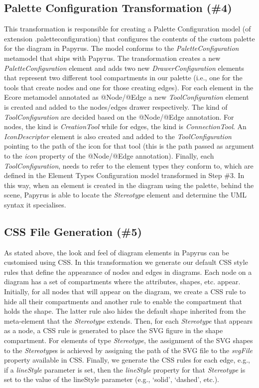 \subsection{Palette Configuration Transformation (\#4)}
\label{sec:paletteGeneration}
This transformation is responsible for creating a Palette Configuration model (of extension .paletteconfiguration) that configures the contents of the custom palette for the diagram in Papyrus. 
The model conforms to the \textit{PaletteConfiguration} metamodel that ships with Papyrus.
The transformation creates a new \textit{PaletteConfiguration} element and adds two new \textit{DrawerConfiguration} elements that represent two different tool compartments in our palette (i.e., one for the tools that create nodes and one for those creating edges). 
For each element in the Ecore metamodel annotated as @Node/@Edge a new \textit{ToolConfiguration} element is created and added to the nodes/edges drawer respectively. 
The kind of \textit{ToolConfiguration} are decided based on the @Node/@Edge annotation. For nodes, the kind is \textit{CreationTool} while for edges, the kind is \textit{ConnectionTool}.
An \textit{IconDescriptor} element is also created and added to the \textit{ToolConfiguration} pointing to the path of the icon for that tool (this is the path passed as argument to the \textit{icon} property of the @Node/@Edge annotation).
Finally, each \textit{ToolConfiguration}, needs to refer to the element types they conform to, which are defined in the Element Types Configuration model transformed in Step \#3. 
In this way, when an element is created in the diagram using the palette, behind the scene, Papyrus is able to locate the \textit{Stereotype} element and determine the UML syntax it specialises.

\subsection{CSS File Generation (\#5)}
\label{sec:cssGeneration}
As stated above, the look and feel of diagram elements in Papyrus can be customised using CSS. 
In this transformation we generate our default CSS style rules that define the appearance of nodes and edges in diagrams. 
Each node on a diagram has a set of compartments where the attributes, shapes, etc. appear. 
Initially, for all nodes that will appear on the diagram, we create a CSS rule to hide all their compartments and another rule to enable the compartment that holds the shape. 
The latter rule also hides the default shape inherited from the meta-element that the \textit{Stereotype} extends. 
Then, for each \textit{Stereotype} that appears as a node, a CSS rule is generated to place the SVG figure in the shape compartment. 
For elements of type \textit{Stereotype}, the assignment of the SVG shapes to the \textit{Stereotype}s is achieved by assigning the path of the SVG file to the \textit{svgFile} property available in CSS. 
Finally, we generate the CSS rules for each edge, e.g., if a \emph{lineStyle} parameter is set, then the \textit{lineStyle} property for that \textit{Stereotype} is set to the value of the lineStyle parameter (e.g., `solid', `dashed', etc.).

